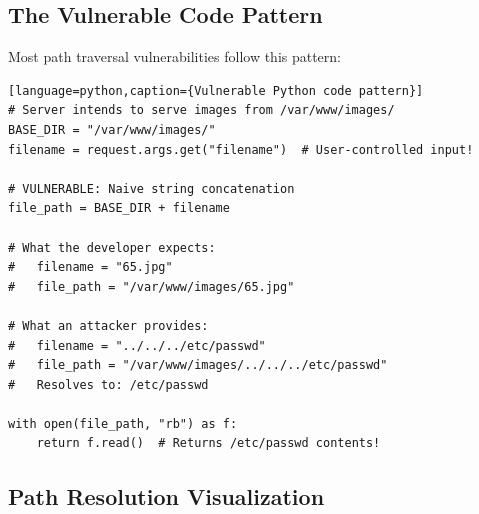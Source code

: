 \documentclass[11pt,letterpaper]{article}
\begin{document}
\subsection{The Vulnerable Code Pattern}

Most path traversal vulnerabilities follow this pattern:

\begin{verbatim}[language=python,caption={Vulnerable Python code pattern}]
# Server intends to serve images from /var/www/images/
BASE_DIR = "/var/www/images/"
filename = request.args.get("filename")  # User-controlled input!

# VULNERABLE: Naive string concatenation
file_path = BASE_DIR + filename

# What the developer expects:
#   filename = "65.jpg"
#   file_path = "/var/www/images/65.jpg"

# What an attacker provides:
#   filename = "../../../etc/passwd"
#   file_path = "/var/www/images/../../../etc/passwd"
#   Resolves to: /etc/passwd

with open(file_path, "rb") as f:
    return f.read()  # Returns /etc/passwd contents!
\end{verbatim}

\subsection{Path Resolution Visualization}
\end{document}
